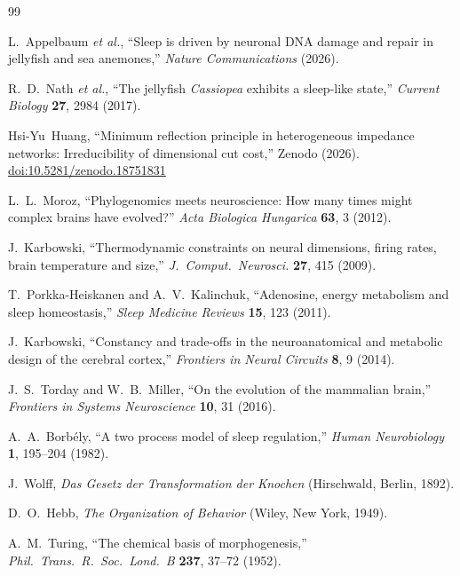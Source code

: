 ﻿\documentclass[aps,pre,twocolumn,superscriptaddress,floatfix]{revtex4-2}
\begin{document}
\begin{thebibliography}{99}

L.~Appelbaum \emph{et al.},
``Sleep is driven by neuronal DNA damage and repair
in jellyfish and sea anemones,''
\emph{Nature Communications} (2026).

R.~D.~Nath \emph{et al.},
``The jellyfish \textit{Cassiopea} exhibits a sleep-like state,''
\emph{Current Biology} \textbf{27}, 2984 (2017).

Hsi-Yu~Huang,
``Minimum reflection principle in heterogeneous impedance networks:
Irreducibility of dimensional cut cost,''
Zenodo (2026).
\href{https://doi.org/10.5281/zenodo.18751831}{doi:10.5281/zenodo.18751831}

L.~L.~Moroz,
``Phylogenomics meets neuroscience:
How many times might complex brains have evolved?''
\emph{Acta Biologica Hungarica} \textbf{63}, 3 (2012).

J.~Karbowski,
``Thermodynamic constraints on neural dimensions, firing rates,
brain temperature and size,''
\emph{J.\ Comput.\ Neurosci.} \textbf{27}, 415 (2009).

T.~Porkka-Heiskanen and A.~V.~Kalinchuk,
``Adenosine, energy metabolism and sleep homeostasis,''
\emph{Sleep Medicine Reviews} \textbf{15}, 123 (2011).

J.~Karbowski,
``Constancy and trade-offs in the neuroanatomical
and metabolic design of the cerebral cortex,''
\emph{Frontiers in Neural Circuits} \textbf{8}, 9 (2014).

J.~S.~Torday and W.~B.~Miller,
``On the evolution of the mammalian brain,''
\emph{Frontiers in Systems Neuroscience} \textbf{10}, 31 (2016).

A.~A.~Borb\'{e}ly,
``A two process model of sleep regulation,''
\emph{Human Neurobiology} \textbf{1}, 195--204 (1982).

J.~Wolff,
\emph{Das Gesetz der Transformation der Knochen}
(Hirschwald, Berlin, 1892).

D.~O.~Hebb,
\emph{The Organization of Behavior}
(Wiley, New York, 1949).

A.~M.~Turing,
``The chemical basis of morphogenesis,''
\emph{Phil.\ Trans.\ R.\ Soc.\ Lond.\ B}
\textbf{237}, 37--72 (1952).

\end{thebibliography}
\end{document}
